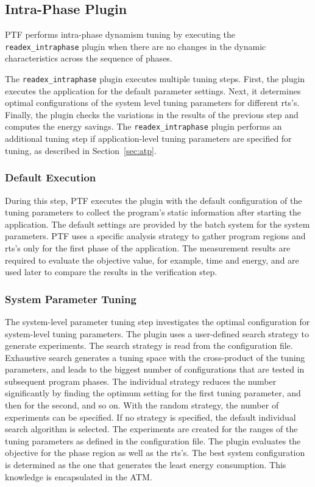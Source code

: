 \subsection{Intra-Phase Plugin} \label{sec:intra-phase}

PTF performs intra-phase dynamism tuning by executing the \linebreak\texttt{readex\_intraphase} plugin when there are no changes in the dynamic characteristics across the sequence of phases.  

The \texttt{readex\_intraphase} plugin executes multiple tuning steps. First, the plugin executes the application for the default parameter settings. Next, it determines optimal configurations of the system level tuning parameters for different rts's. Finally, the plugin checks the variations in the results of the previous step and computes the energy savings. The \texttt{readex\_intraphase} plugin performs an additional tuning step if application-level tuning parameters are specified for tuning, as described in Section~\ref{sec:atp}.

\subsubsection{Default Execution} \label{intra-default-execution} 

During this step, PTF executes the plugin with the default configuration of the tuning parameters to collect the program's static information after starting the application. The default settings are provided by the batch system for the system parameters. PTF uses a specific analysis strategy to gather program regions and rts's only for the first phase of the application. The measurement results are required to evaluate the objective value, for example, time and energy, and are used later to compare the results in the verification step.

\subsubsection{System Parameter Tuning} \label{sys-tuning} 

The system-level parameter tuning step investigates the optimal configuration for system-level tuning parameters. The plugin uses a user-defined search strategy to generate experiments. The search strategy is read from the configuration file. Exhaustive search generates a tuning space with the cross-product of the tuning parameters, and leads to the biggest number of configurations that are tested in subsequent program phases. The individual strategy reduces the number significantly by finding the optimum setting for the first tuning parameter, and then for the second, and so on. With the random strategy, the number of experiments can be specified. If no strategy is specified, the default individual search algorithm is selected. The experiments are created for the ranges of the tuning parameters as defined in the configuration file. The plugin evaluates the objective for the phase region as well as the rts's. The best system configuration is determined as the one that generates the least energy consumption. This knowledge is encapsulated in the ATM. 

